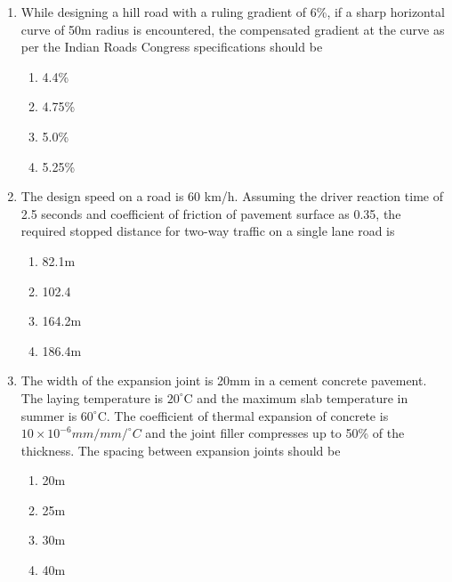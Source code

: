 \documentclass[journal]{IEEEtran}
\begin{document}
\begin{enumerate}
{        %
        
        }
    \item{
            While designing a hill road with a ruling gradient of 6\%, if a sharp horizontal curve of 50m radius is encountered, the compensated gradient at the curve as per the Indian Roads Congress specifications should be
             \hfill
                
            \begin{multicols}{4}
                \begin{enumerate}
                	\item 4.4\%
                	\item 4.75\%
                	\item 5.0\%
                	\item 5.25\%
                \end{enumerate}
            \end{multicols}
        
        }
    \item{
            The design speed on a road is 60 km/h. Assuming the driver reaction time of 2.5 seconds and coefficient of friction of pavement surface as 0.35, the required stopped distance for two-way traffic on a single lane road is 
             \hfill
                
			\begin{multicols}{4}
				\begin{enumerate}
					\item 82.1m
					\item 102.4
					\item 164.2m
					\item 186.4m
				\end{enumerate}
			\end{multicols}
        
        }
    \item{
        
           	The width of the expansion joint is 20mm in a cement concrete pavement. The laying temperature is $20^{\circ}$C and the maximum slab temperature in summer is $60^{\circ}$C. The coefficient of thermal expansion of concrete is $10 \times 10^{-6} mm/mm/^{\circ}C$ and the joint filler compresses up to 50\% of the thickness. The spacing between expansion joints should be
             \text{   }\hfill
                
            \begin{multicols}{4}
                \begin{enumerate}
                	\item 20m
                	\item 25m
                	\item 30m
                	\item 40m
                \end{enumerate}
            \end{multicols}
        
}
\end{enumerate}
\end{document}

